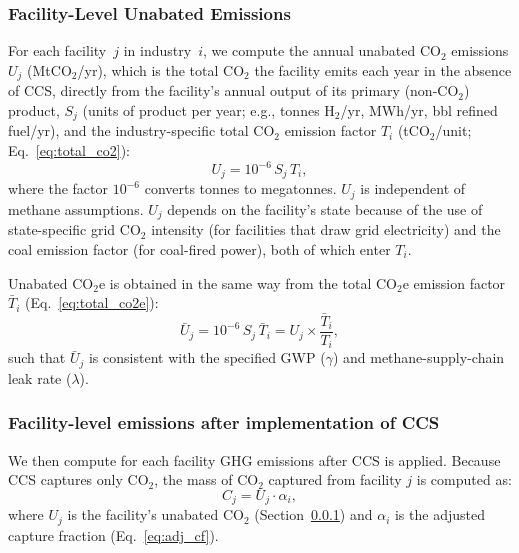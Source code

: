 \documentclass[11pt]{article}
\newcommand{\cotwo}{\ensuremath{\mathrm{CO_2}}}
\newcommand{\cotwoe}{\ensuremath{\mathrm{CO_{2}e}}}
\begin{document}
\subsubsection{Facility-Level Unabated Emissions}
\label{sec:co2e_adjust}

For each facility~$j$ in industry~$i$, we compute the annual unabated \cotwo{} emissions $U_j$ (Mt\cotwo{}/yr), which is the total \cotwo{} the facility emits each year in the absence of CCS, directly from the facility's annual output of its primary (non-\cotwo{}) product, $S_j$ (units of product per year; e.g., tonnes H$_2$/yr, MWh/yr, bbl refined fuel/yr), and the industry-specific total \cotwo{} emission factor $T_i$ (t\cotwo{}/unit; Eq.~\ref{eq:total_co2}):
%
\begin{equation}
  U_j = 10^{-6}\, S_j\, T_i,
  \label{eq:unabated}
\end{equation}
%
where the factor $10^{-6}$ converts tonnes to megatonnes.
$U_j$ is independent of methane assumptions.  $U_j$ depends on the facility's state because of the use of state-specific grid \cotwo{} intensity (for facilities that draw grid electricity) and the coal emission factor (for coal-fired power), both of which enter $T_i$.

Unabated \cotwoe{} is obtained in the same way from the total \cotwoe{} emission factor $\bar{T}_i$ (Eq.~\ref{eq:total_co2e}):
%
\begin{equation}
  \bar{U}_j = 10^{-6}\, S_j\, \bar{T}_i = U_j \times \frac{\bar{T}_i}{T_i},
  \label{eq:co2e_adjust}
\end{equation}
%
such that $\bar{U}_j$ is consistent with the specified GWP ($\gamma$) and methane-supply-chain leak rate ($\lambda$).

\subsubsection{Facility-level emissions after implementation of CCS}
\label{sec:captured}

We then compute for each facility GHG emissions after CCS is applied. Because CCS captures only \cotwo{}, the mass of \cotwo{} captured from facility $j$ is computed as:
%
\begin{equation}
  C_j = U_j \cdot \alpha_i,
  \label{eq:proj_captured}
\end{equation}
%
where $U_j$ is the facility's unabated \cotwo{} (Section~\ref{sec:co2e_adjust}) and $\alpha_i$ is the adjusted capture fraction (Eq.~\ref{eq:adj_cf}).
\end{document}
